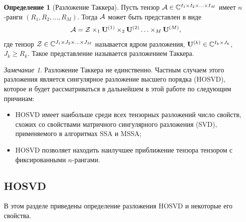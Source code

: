 \documentclass[specialist,
  substylefile=spbu.rtx,
subf,href,colorlinks=true, 12pt]{disser}
\theoremstyle{plain}
\theoremstyle{definition}
\newtheorem{definition}{Определение}[section]
\theoremstyle{remark}
\newtheorem*{remark}{Замечание}
\begin{document}
\begin{definition}[Разложение Таккера]
  Пусть тензор $\mathcal{A} \in \mathbb{C}^{I_1 \times I_2 \times \ldots \times I_M}$ имеет $n$-ранги
  $(R_1, R_2, \ldots, R_M)$.
  Тогда $\mathcal{A}$ может быть представлен в виде
  \begin{equation}
    \label{eq:tucker-decomp}
    \mathcal{A} = \mathcal{Z} \times_1 \mathbf{U}^{(1)} \times_2 \mathbf{U}^{(2)} \ldots \times_M \mathbf{U}^{(M)},
  \end{equation}
  где тензор $\mathcal{Z} \in \mathbb{C}^{J_1 \times J_2 \times \ldots \times J_M}$ называется ядром разложения,
  $\mathbf{U}^{(k)} \in \mathbb{C}^{I_k \times J_k}$, $J_k \geqslant R_k$.
  Такое представление называется разложением Таккера.
\end{definition}

\begin{remark}
  Разложение Таккера не единственно.
  Частным случаем этого разложения является сингулярное разложение высшего порядка (HOSVD),
  которое и будет рассматриваться в дальнейшем в этой работе по следующим причинам:
  \begin{itemize}
    \item HOSVD имеет наибольше среди всех тензорных разложений
      число свойств, схожих со свойствами матричного сингулярного разложения (SVD),
      применяемого в алгоритмах SSA и MSSA;
    \item HOSVD позволяет находить наилучшее приближение тензора тензором с
      фиксированными $n$-рангами.
  \end{itemize}
\end{remark}


\subsection{HOSVD}\label{subsec:hosvd}
В этом разделе приведены определение разложения HOSVD и некоторые его свойства.

\end{document}
